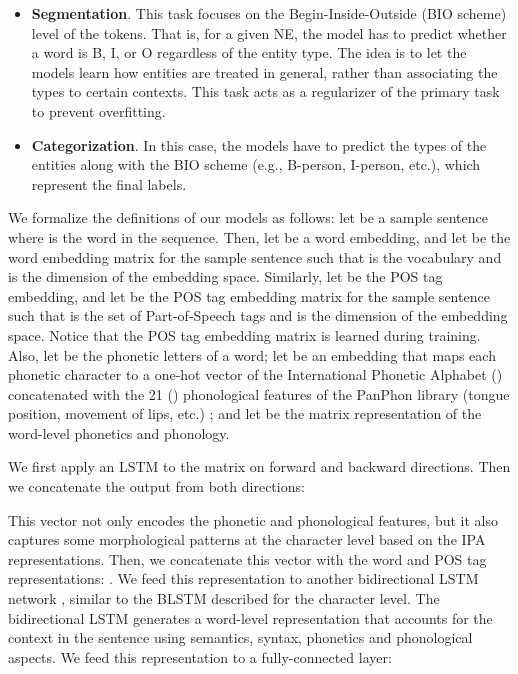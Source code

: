 \documentclass[11pt,a4paper]{article}
\begin{document}
\begin{itemize}
\item \textbf{Segmentation}. This task focuses on the Begin-Inside-Outside (BIO scheme) level of the tokens. That is, for a given NE, the model has to predict whether a word is B, I, or O regardless of the entity type. The idea is to let the models learn how entities are treated in general, rather than associating the types to certain contexts. This task acts as a regularizer of the primary task to prevent overfitting.
\item \textbf{Categorization}. In this case, the models have to predict the types of the entities along with the BIO scheme (e.g., B-person, I-person, etc.), which represent the final labels.
\end{itemize}

We formalize the definitions of our models as follows: let  be a sample sentence where  is the  word in the sequence. Then, let  be a word embedding, and let  be the word embedding matrix for the sample sentence such that  is the vocabulary and  is the dimension of the embedding space. Similarly, let  be the POS tag embedding, and let  be the POS tag embedding matrix for the sample sentence such that  is the set of Part-of-Speech tags and   is the dimension of the embedding space. Notice that the POS tag embedding matrix  is learned during training. Also, let  be the phonetic letters of a word; let   be  an embedding that maps each phonetic character to a one-hot vector of the International Phonetic Alphabet () concatenated with the 21 () phonological features of the PanPhon library (tongue position, movement of lips, etc.) \citep{bharadwaj-EtAl:2016:EMNLP2016}; and let  be the matrix representation of the word-level phonetics and phonology.

We first apply an LSTM \citep{Hochreiter:1997:LSM:1246443.1246450} to the  matrix on forward and backward directions. Then we concatenate the output from both directions:


This vector not only encodes the phonetic and phonological features, but it also captures some morphological patterns at the character level based on the IPA representations. Then, we concatenate this vector with the word and POS tag representations: . We feed this representation to another bidirectional LSTM network \citep{dyer:2015acl}, similar to the BLSTM described for the character level. The bidirectional LSTM generates a word-level representation that accounts for the context in the sentence using semantics, syntax, phonetics and phonological aspects. We feed this representation to a fully-connected layer:
\end{document}
